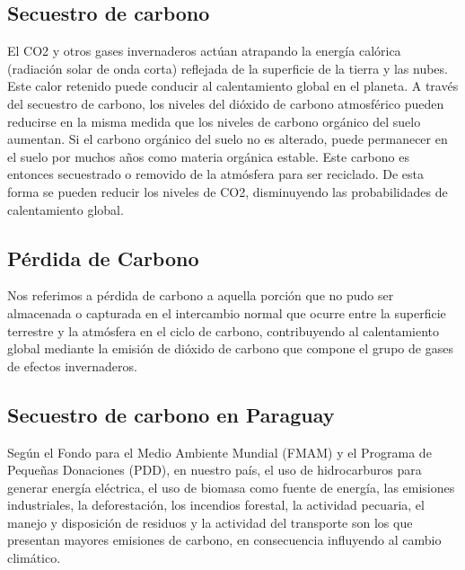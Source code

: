 \subsection{Secuestro de carbono}
El CO2 y otros gases invernaderos actúan atrapando la energ\'ia cal\'orica (radiación solar de onda corta) reflejada de la superficie de la tierra y las nubes. Este calor retenido puede conducir al calentamiento global en el planeta. A trav\'es del secuestro de carbono, los niveles del di\'oxido de carbono atmosf\'erico pueden reducirse en la misma medida que los niveles de carbono org\'anico del suelo aumentan. Si el carbono org\'anico del suelo no es alterado, puede permanecer en el suelo por muchos a\~{n}os como materia org\'anica estable. Este carbono es entonces secuestrado o removido de la atm\'osfera para ser reciclado. De esta forma se pueden reducir los niveles de CO2, disminuyendo las probabilidades de calentamiento global\cite{encaptura}.
\subsection{P\'erdida de Carbono}
Nos referimos a p\'erdida de carbono a aquella porci\'on que no pudo ser almacenada o capturada en el intercambio normal que ocurre entre la superficie terrestre y la atm\'osfera en el ciclo de carbono, contribuyendo al calentamiento global mediante la emisión de di\'oxido de carbono que compone el grupo de gases de efectos invernaderos.
\subsection{Secuestro de carbono en Paraguay}
Seg\'un el Fondo para el Medio Ambiente Mundial (FMAM) y el Programa de Peque\~{n}as Donaciones (PDD), en nuestro pa\'is, el uso de hidrocarburos para generar energ\'ia el\'ectrica, el uso de biomasa como fuente de energ\'ia, las emisiones industriales, la deforestaci\'on, los incendios forestal, la actividad pecuaria, el manejo y disposici\'on de residuos y la actividad del transporte son los que presentan mayores emisiones de carbono, en consecuencia influyendo al cambio clim\'atico\cite{cecilia2010Proyecto}.
